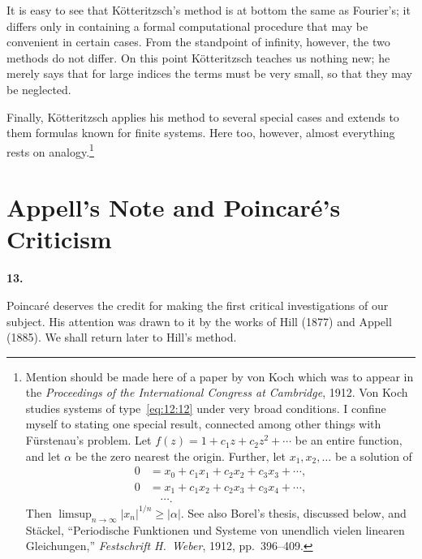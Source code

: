 \documentclass[
  paper=b5,
  fontsize=13pt,
  twoside=true,
  open=any,
  bookmarkpackage=false,
  chapterprefix=true,
  headings=normal
]{scrbook}
\theoremstyle{definition}
\newcommand{\numberedparagraph}[1]{%
  \par\medskip\phantomsection\label{sec:#1}%
  \noindent\textbf{#1.}\enspace
}
\begin{document}
It is easy to see that K\"otteritzsch's method is at bottom the same as Fourier's; it differs only in containing a formal computational procedure that may be convenient in certain cases. From the standpoint of infinity, however, the two methods do not differ. On this point K\"otteritzsch teaches us nothing new; he merely says that for large indices the terms must be very small, so that they may be neglected.

Finally, K\"otteritzsch applies his method to several special cases and extends to them formulas known for finite systems. Here too, however, almost everything rests on analogy.\footnote{Mention should be made here of a paper by von Koch which was to appear in the \emph{Proceedings of the International Congress at Cambridge}, 1912. Von Koch studies systems of type~\eqref{eq:12:12} under very broad conditions. I confine myself to stating one special result, connected among other things with F\"urstenau's problem. Let $f(z)=1+c_1z+c_2z^2+\cdots$ be an entire function, and let $\alpha$ be the zero nearest the origin. Further, let $x_1,x_2,\ldots$ be a solution of
\[
\begin{aligned}
0&=x_0+c_1x_1+c_2x_2+c_3x_3+\cdots,\\
0&=x_1+c_1x_2+c_2x_3+c_3x_4+\cdots,\\
&\hspace{1em}\cdots.
\end{aligned}
\]
Then $\limsup_{n\to\infty}|x_n|^{1/n}\geq|\alpha|$. See also Borel's thesis, discussed below, and St\"ackel, ``Periodische Funktionen und Systeme von unendlich vielen linearen Gleichungen,'' \emph{Festschrift H.~Weber}, 1912, pp.~396--409.}

\section{Appell's Note and Poincar\'e's Criticism}

\numberedparagraph{13}
Poincar\'e deserves the credit for making the first critical investigations of our subject. His attention was drawn to it by the works of Hill (1877) and Appell (1885). We shall return later to Hill's method.
\end{document}
